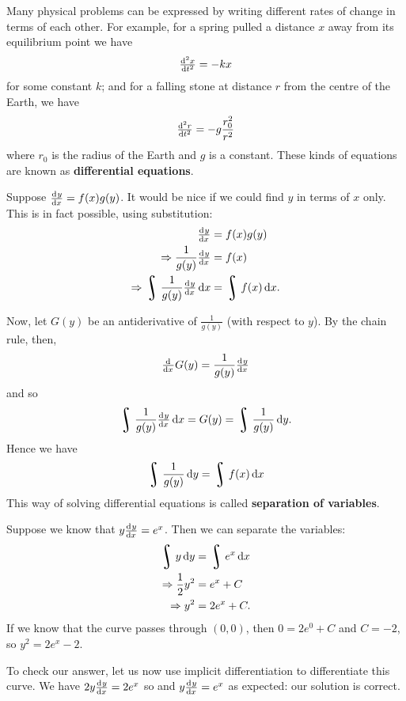 


Many physical problems can be expressed by writing different rates of change in terms of each other. For example,
for a spring pulled a distance $ x $ away from its equilibrium point we have
\begin{displaymath}
  \od[2]{x}{t} = -kx
\end{displaymath}
for some constant $ k $; and for a falling stone at distance $ r $ from the centre of the Earth, we have
\begin{displaymath}
  \od[2]{r}{t} = -g \frac{r_0^2}{r^2}
\end{displaymath}
where $ r_0 $ is the radius of the Earth and $ g $ is a constant. These kinds of equations are known as \textbf{differential equations}.

Suppose $ \od{y}{x} = f(x) g(y) $. It would be nice if we could find $ y $ in terms of $ x $ only. This
is in fact possible, using substitution:
\begin{align*}
  \od{y}{x} &= f(x) g(y) \\
  \Rightarrow \frac{1}{g(y)} \od{y}{x} &= f(x)\\
  \Rightarrow \rint \frac{1}{g(y)} \od{y}{x} \dif{x} &= \rint f(x) \dif{x}.
\end{align*}

Now, let $ G(y) $ be an antiderivative of $ \frac{1}{g(y)} $ (with respect to $ y $). By the chain rule, then,
\begin{displaymath}
  \od{}{x} G(y) = \frac{1}{g(y)} \od{y}{x}
\end{displaymath}
and so
\begin{displaymath}
  \rint \frac{1}{g(y)} \od{y}{x} \dif{x} = G(y) = \rint \frac{1}{g(y)} \dif{y}.
\end{displaymath}
Hence we have
\begin{displaymath}
  \rint \frac{1}{g(y)} \dif{y} = \rint f(x) \dif{x}
\end{displaymath}
This way of solving differential equations is called \textbf{separation of variables}.

\begin{ex}
  Suppose we know that $ y\od{y}{x} = e^x $. Then we can separate the variables:
  \begin{align*}
    \rint y \dif{y} &= \rint e^x \dif{x}\\
    \Rightarrow \frac{1}{2} y^2 &= e^x + C\\
    \Rightarrow y^2 &= 2e^x + C.
  \end{align*}
  If we know that the curve passes through $ (0,0) $, then $ 0 = 2e^0 + C $ and $ C = -2 $, so $ y^2 = 2e^x - 2 $.

  To check our answer, let us now use implicit differentiation to differentiate this curve. We have $ 2y \od{y}{x} = 2e^x $ so and $ y \od{y}{x} = e^x $
  as expected: our solution is correct.
\end{ex}

